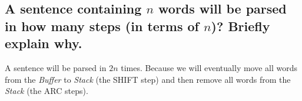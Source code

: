 \documentclass[12pt, letterpaper]{article}
\begin{document}
\subsection{A sentence containing $n$ words will be parsed in how many steps (in terms of $n$)? Briefly explain why.}

A sentence will be parsed in $2 n$ times. Because we will eventually move all words from the \textit{Buffer} to \textit{Stack} (the SHIFT step) and then remove all words from the \textit{Stack} (the ARC steps).

%
\end{document}
